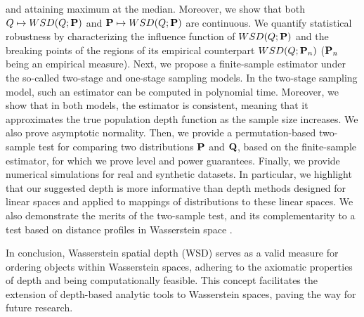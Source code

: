 \documentclass{imsart}
\numberwithin{equation}{section}
\begin{document}
and attaining maximum at the median. Moreover, we show that both $Q\mapsto  {\rm WSD}(Q; {\bf P})$ and ${\bf P}\mapsto  {\rm WSD}(Q; {\bf P})$ are continuous.  
We quantify statistical robustness by characterizing the influence function of ${\rm WSD}(Q; {\bf P})$ and the breaking points of the regions of its empirical counterpart ${\rm WSD}(Q; {\bf P}_n)$ (${\bf P}_n$ being an empirical measure).
Next, we propose a finite-sample estimator under the so-called two-stage and one-stage sampling models. In the two-stage sampling model, such an estimator  can be computed in polynomial time. Moreover, we show that in both models, the estimator is  consistent, meaning that it approximates the true population depth function as the sample size increases. 
We also prove asymptotic normality.
Then, we provide a permutation-based two-sample test for comparing two distributions ${\bf P}$ and ${\bf Q}$, based on the finite-sample estimator, for which we prove level and power guarantees.
Finally, we provide numerical simulations for real and synthetic datasets. In particular, we highlight that our suggested depth is more informative than depth methods designed for linear spaces and applied to mappings of distributions to these linear spaces.
We also demonstrate the merits of the two-sample test, and its complementarity to a test based on distance profiles in Wasserstein space \cite{dubey2024metric}. 

In conclusion, Wasserstein spatial depth (WSD) serves as a valid measure for ordering objects within Wasserstein spaces, adhering to the axiomatic properties of depth \citep{zuo2000general} and being computationally feasible. This concept facilitates the extension of depth-based analytic tools to Wasserstein spaces, paving the way for future research.
\end{document}
